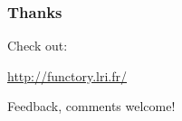 \documentclass[xcolor=dvipsnames]{beamer}
\begin{document}

\begin{frame}\frametitle {Thanks}


\bigskip
Check out:
\begin{center}
 \textcolor{blue}{\url{http://functory.lri.fr/}}  
\end{center}

Feedback, comments welcome!

\end{frame}

\end{document}
